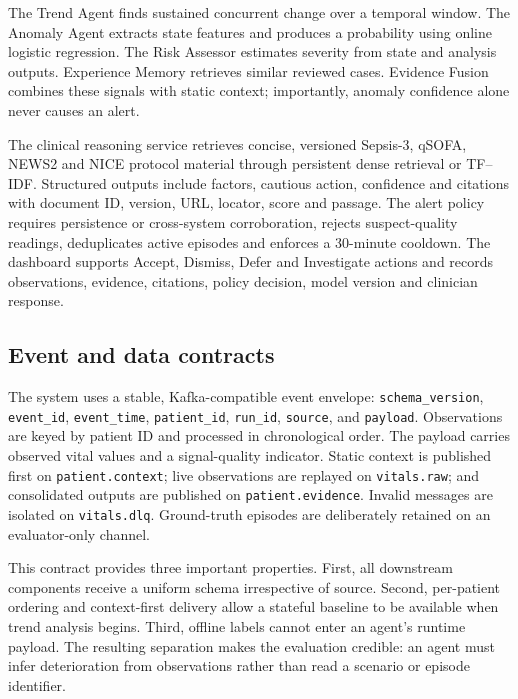 \documentclass[11pt,a4paper]{article}
\begin{document}
The Trend Agent finds sustained concurrent change over a temporal window. The Anomaly Agent extracts state features and produces a probability using online logistic regression. The Risk Assessor estimates severity from state and analysis outputs. Experience Memory retrieves similar reviewed cases. Evidence Fusion combines these signals with static context; importantly, anomaly confidence alone never causes an alert.

The clinical reasoning service retrieves concise, versioned Sepsis-3, qSOFA, NEWS2 and NICE protocol material through persistent dense retrieval or TF--IDF. Structured outputs include factors, cautious action, confidence and citations with document ID, version, URL, locator, score and passage. The alert policy requires persistence or cross-system corroboration, rejects suspect-quality readings, deduplicates active episodes and enforces a 30-minute cooldown. The dashboard supports Accept, Dismiss, Defer and Investigate actions and records observations, evidence, citations, policy decision, model version and clinician response.

\subsection{Event and data contracts}
The system uses a stable, Kafka-compatible event envelope: \texttt{schema\_version}, \texttt{event\_id}, \texttt{event\_time}, \texttt{patient\_id}, \texttt{run\_id}, \texttt{source}, and \texttt{payload}. Observations are keyed by patient ID and processed in chronological order. The payload carries observed vital values and a signal-quality indicator. Static context is published first on \texttt{patient.context}; live observations are replayed on \texttt{vitals.raw}; and consolidated outputs are published on \texttt{patient.evidence}. Invalid messages are isolated on \texttt{vitals.dlq}. Ground-truth episodes are deliberately retained on an evaluator-only channel.

This contract provides three important properties. First, all downstream components receive a uniform schema irrespective of source. Second, per-patient ordering and context-first delivery allow a stateful baseline to be available when trend analysis begins. Third, offline labels cannot enter an agent's runtime payload. The resulting separation makes the evaluation credible: an agent must infer deterioration from observations rather than read a scenario or episode identifier.
\end{document}
